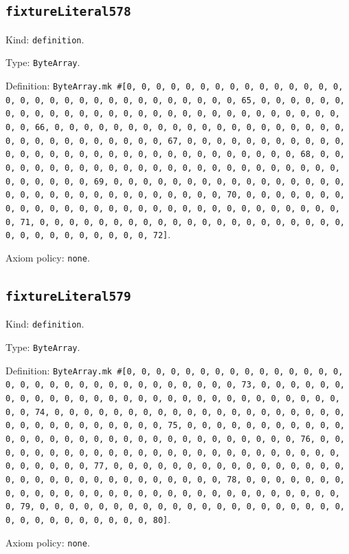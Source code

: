 \documentclass[11pt]{article}
\begin{document}
\subsection*{\texttt{fixtureLiteral578}}
\noindent Kind: \texttt{definition}.\par
\noindent Type: \texttt{ByteArray}.\par
\noindent Definition: \texttt{ByteArray.mk \#[0, 0, 0, 0, 0, 0, 0, 0, 0, 0, 0, 0, 0, 0, 0, 0, 0, 0, 0, 0, 0, 0, 0, 0, 0, 0, 0, 0, 0, 0, 0, 65, 0, 0, 0, 0, 0, 0, 0, 0, 0, 0, 0, 0, 0, 0, 0, 0, 0, 0, 0, 0, 0, 0, 0, 0, 0, 0, 0, 0, 0, 0, 0, 66, 0, 0, 0, 0, 0, 0, 0, 0, 0, 0, 0, 0, 0, 0, 0, 0, 0, 0, 0, 0, 0, 0, 0, 0, 0, 0, 0, 0, 0, 0, 0, 67, 0, 0, 0, 0, 0, 0, 0, 0, 0, 0, 0, 0, 0, 0, 0, 0, 0, 0, 0, 0, 0, 0, 0, 0, 0, 0, 0, 0, 0, 0, 0, 68, 0, 0, 0, 0, 0, 0, 0, 0, 0, 0, 0, 0, 0, 0, 0, 0, 0, 0, 0, 0, 0, 0, 0, 0, 0, 0, 0, 0, 0, 0, 0, 69, 0, 0, 0, 0, 0, 0, 0, 0, 0, 0, 0, 0, 0, 0, 0, 0, 0, 0, 0, 0, 0, 0, 0, 0, 0, 0, 0, 0, 0, 0, 0, 70, 0, 0, 0, 0, 0, 0, 0, 0, 0, 0, 0, 0, 0, 0, 0, 0, 0, 0, 0, 0, 0, 0, 0, 0, 0, 0, 0, 0, 0, 0, 0, 71, 0, 0, 0, 0, 0, 0, 0, 0, 0, 0, 0, 0, 0, 0, 0, 0, 0, 0, 0, 0, 0, 0, 0, 0, 0, 0, 0, 0, 0, 0, 0, 72]}.\par
\noindent Axiom policy: \texttt{none}.\par
\subsection*{\texttt{fixtureLiteral579}}
\noindent Kind: \texttt{definition}.\par
\noindent Type: \texttt{ByteArray}.\par
\noindent Definition: \texttt{ByteArray.mk \#[0, 0, 0, 0, 0, 0, 0, 0, 0, 0, 0, 0, 0, 0, 0, 0, 0, 0, 0, 0, 0, 0, 0, 0, 0, 0, 0, 0, 0, 0, 0, 73, 0, 0, 0, 0, 0, 0, 0, 0, 0, 0, 0, 0, 0, 0, 0, 0, 0, 0, 0, 0, 0, 0, 0, 0, 0, 0, 0, 0, 0, 0, 0, 74, 0, 0, 0, 0, 0, 0, 0, 0, 0, 0, 0, 0, 0, 0, 0, 0, 0, 0, 0, 0, 0, 0, 0, 0, 0, 0, 0, 0, 0, 0, 0, 75, 0, 0, 0, 0, 0, 0, 0, 0, 0, 0, 0, 0, 0, 0, 0, 0, 0, 0, 0, 0, 0, 0, 0, 0, 0, 0, 0, 0, 0, 0, 0, 76, 0, 0, 0, 0, 0, 0, 0, 0, 0, 0, 0, 0, 0, 0, 0, 0, 0, 0, 0, 0, 0, 0, 0, 0, 0, 0, 0, 0, 0, 0, 0, 77, 0, 0, 0, 0, 0, 0, 0, 0, 0, 0, 0, 0, 0, 0, 0, 0, 0, 0, 0, 0, 0, 0, 0, 0, 0, 0, 0, 0, 0, 0, 0, 78, 0, 0, 0, 0, 0, 0, 0, 0, 0, 0, 0, 0, 0, 0, 0, 0, 0, 0, 0, 0, 0, 0, 0, 0, 0, 0, 0, 0, 0, 0, 0, 79, 0, 0, 0, 0, 0, 0, 0, 0, 0, 0, 0, 0, 0, 0, 0, 0, 0, 0, 0, 0, 0, 0, 0, 0, 0, 0, 0, 0, 0, 0, 0, 80]}.\par
\noindent Axiom policy: \texttt{none}.\par
\end{document}

